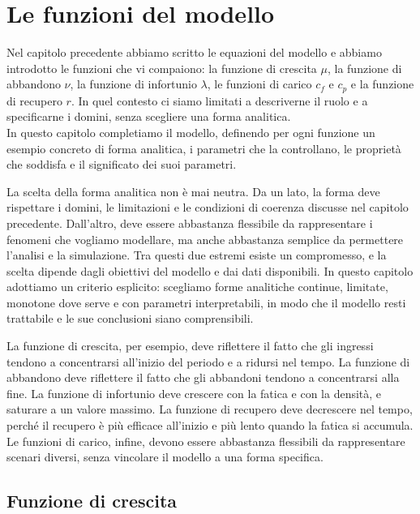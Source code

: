 \chapter{Le funzioni del modello}

Nel capitolo precedente abbiamo scritto le equazioni del modello e abbiamo introdotto le funzioni che vi compaiono: la funzione di crescita $\mu$, la funzione di abbandono $\nu$, la funzione di infortunio $\lambda$, le funzioni di carico $c_f$ e $c_p$ e la funzione di recupero $r$. In quel contesto ci siamo limitati a descriverne il ruolo e a specificarne i domini, senza scegliere una forma analitica. \\
In questo capitolo completiamo il modello, definendo per ogni funzione un esempio concreto di forma analitica, i parametri che la controllano, le proprietà che soddisfa e il significato dei suoi parametri. \par

La scelta della forma analitica non è mai neutra. Da un lato, la forma deve rispettare i domini, le limitazioni e le condizioni di coerenza discusse nel capitolo precedente. Dall'altro, deve essere abbastanza flessibile da rappresentare i fenomeni che vogliamo modellare, ma anche abbastanza semplice da permettere l'analisi e la simulazione. Tra questi due estremi esiste un compromesso, e la scelta dipende dagli obiettivi del modello e dai dati disponibili. In questo capitolo adottiamo un criterio esplicito: scegliamo forme analitiche continue, limitate, monotone dove serve e con parametri interpretabili, in modo che il modello resti trattabile e le sue conclusioni siano comprensibili. \par

La funzione di crescita, per esempio, deve riflettere il fatto che gli ingressi tendono a concentrarsi all'inizio del periodo e a ridursi nel tempo. La funzione di abbandono deve riflettere il fatto che gli abbandoni tendono a concentrarsi alla fine. La funzione di infortunio deve crescere con la fatica e con la densità, e saturare a un valore massimo. La funzione di recupero deve decrescere nel tempo, perché il recupero è più efficace all'inizio e più lento quando la fatica si accumula. Le funzioni di carico, infine, devono essere abbastanza flessibili da rappresentare scenari diversi, senza vincolare il modello a una forma specifica.

\section{Funzione di crescita}

